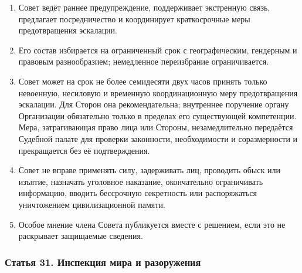 \documentclass[
  russian,
  11pt,
  a4paper,
]{article}
\providecommand{\tightlist}{%
  \setlength{\itemsep}{0pt}\setlength{\parskip}{0pt}}
\begin{document}
\begin{enumerate}
\def\labelenumi{\arabic{enumi}.}
\tightlist
\item
  Совет ведёт раннее предупреждение, поддерживает экстренную связь,
  предлагает посредничество и координирует краткосрочные меры
  предотвращения эскалации.
\item
  Его состав избирается на ограниченный срок с географическим, гендерным
  и правовым разнообразием; немедленное переизбрание ограничивается.
\item
  Совет может на срок не более семидесяти двух часов принять только
  невоенную, несиловую и временную координационную меру предотвращения
  эскалации. Для Сторон она рекомендательна; внутреннее поручение органу
  Организации обязательно только в пределах его существующей
  компетенции. Мера, затрагивающая право лица или Стороны,
  незамедлительно передаётся Судебной палате для проверки законности,
  необходимости и соразмерности и прекращается без её подтверждения.
\item
  Совет не вправе применять силу, задерживать лиц, проводить обыск или
  изъятие, назначать уголовное наказание, окончательно ограничивать
  информацию, вводить бессрочную секретность или распоряжаться
  уничтожением цивилизационной памяти.
\item
  Особое мнение члена Совета публикуется вместе с решением, если это не
  раскрывает защищаемые сведения.
\end{enumerate}

\subsubsection{Статья 31. Инспекция мира и
разоружения}\label{ux441ux442ux430ux442ux44cux44f-31-ux438ux43dux441ux43fux435ux43aux446ux438ux44f-ux43cux438ux440ux430-ux438-ux440ux430ux437ux43eux440ux443ux436ux435ux43dux438ux44f}
\end{document}
